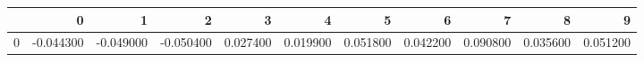 \begin{tabular}{lrrrrrrrrrr}
\toprule
 & 0 & 1 & 2 & 3 & 4 & 5 & 6 & 7 & 8 & 9 \\
\midrule
0 & -0.044300 & -0.049000 & -0.050400 & 0.027400 & 0.019900 & 0.051800 & 0.042200 & 0.090800 & 0.035600 & 0.051200 \\
\bottomrule
\end{tabular}
